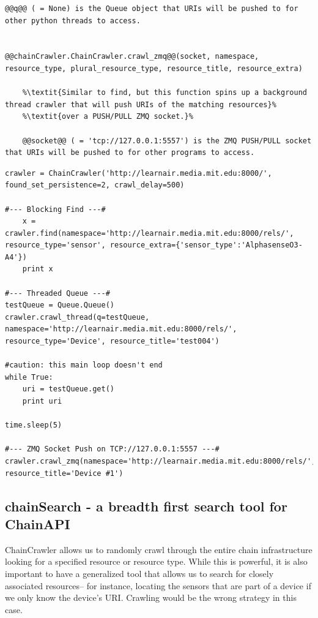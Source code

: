 \begin{lstlisting}[style=codedef]
	@@q@@ ( = None) is the Queue object that URIs will be pushed to for other python threads to access. 


@@chainCrawler.ChainCrawler.crawl_zmq@@(socket, namespace, resource_type, plural_resource_type, resource_title, resource_extra)
	
	%\textit{Similar to find, but this function spins up a background thread crawler that will push URIs of the matching resources}%
	%\textit{over a PUSH/PULL ZMQ socket.}%

	@@socket@@ ( = 'tcp://127.0.0.1:5557') is the ZMQ PUSH/PULL socket that URIs will be pushed to for other programs to access. 

\end{lstlisting}



\begin{lstlisting}[style=code]
crawler = ChainCrawler('http://learnair.media.mit.edu:8000/', found_set_persistence=2, crawl_delay=500)
    
#--- Blocking Find ---#
    x = crawler.find(namespace='http://learnair.media.mit.edu:8000/rels/', resource_type='sensor', resource_extra={'sensor_type':'AlphasenseO3-A4'})
    print x

#--- Threaded Queue ---#
testQueue = Queue.Queue()
crawler.crawl_thread(q=testQueue, namespace='http://learnair.media.mit.edu:8000/rels/', resource_type='Device', resource_title='test004')
    
#caution: this main loop doesn't end
while True:
    uri = testQueue.get()
    print uri

time.sleep(5)

#--- ZMQ Socket Push on TCP://127.0.0.1:5557 ---#
crawler.crawl_zmq(namespace='http://learnair.media.mit.edu:8000/rels/', resource_title='Device #1')
\end{lstlisting}



\subsection{chainSearch - a breadth first search tool for ChainAPI}

ChainCrawler allows us to randomly crawl through the entire chain infrastructure looking for a specified resource or resource type.  While this is powerful, it is also important to have a generalized tool that allows us to search for closely associated resources-- for instance, locating the sensors that are part of a device if we only know the device's URI.  Crawling would be the wrong strategy in this case.  

